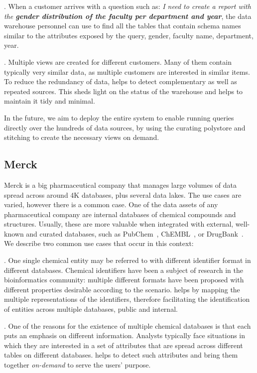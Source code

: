 . When a customer arrives with a question such as: \emph{I need to create a report with the \textbf{gender distribution of the faculty per department and year}}, the data warehouse personnel can use \dcv to find all the tables that contain schema names similar to the attributes exposed by the query, \eg gender, faculty name, department, year.

. Multiple views are created for different customers. Many of them contain typically very similar data, as multiple customers are interested in similar items. To reduce the redundancy of data, \dcv helps to detect complementary as well as repeated sources. This sheds light on the status of the warehouse and helps to maintain it tidy and minimal.

In the future, we aim to deploy the entire \dcv system to enable running queries directly over the hundreds of data sources, by using the curating polystore and stitching to create the necessary views on demand. 

\subsection{Merck}


Merck is a big pharmaceutical company that manages large volumes of data spread across around 4K databases, plus several data lakes. The use cases are varied, however there is a common case. One of the data assets of any pharmaceutical company are internal databases of chemical compounds and structures. Usually, these are more valuable when integrated with external, well-known and curated databases, such as PubChem~\cite{pubchem}, ChEMBL~\cite{ChEMBL}, or DrugBank~\cite{DrugBank}. We describe two common use cases that occur in this context:


. One single chemical entity may be referred to with different identifier format in different databases. Chemical identifiers have been a subject of research in the bioinformatics community: multiple different formats have been proposed with different properties desirable according to the scenario. \dcv helps by mapping the multiple representations of the identifiers, therefore facilitating the identification of entities across multiple databases, public and internal.



. One of the reasons for the existence of multiple chemical databases is that each puts an emphasis on different information. Analysts typically face situations in which they are interested in a set of attributes that are spread across different tables on different databases. \dcv helps to detect such attributes and bring them together \emph{on-demand}  to serve the users' purpose.

